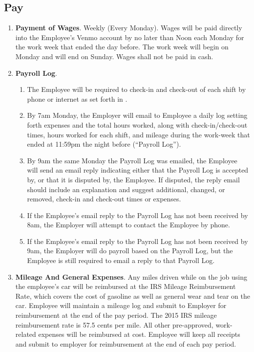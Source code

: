 \documentclass[]{article}
\begin{document}
\subsection*{Pay}
\begin{enumerate}
	\item{\textbf{Payment of Wages}}. Weekly (Every Monday). Wages will be paid directly into the Employee's Venmo account by no later than Noon each Monday for the work week that ended the day before. The work week will begin on Monday and will end on Sunday. Wages shall not be paid in cash.
	\item{\textbf{Payroll Log}}. 
		\begin{enumerate}
			\item The Employee will be required to check-in and check-out of each shift by phone or internet as set forth in . 
			\item By 7am Monday, the Employer will email to Employee a daily log setting forth expenses and the total hours worked, along with check-in/check-out times, hours worked for each shift, and mileage during the work-week that ended at 11:59pm the night before (``Payroll Log'').
			\item By 9am the same Monday the Payroll Log was emailed, the Employee will send an email reply indicating either that the Payroll Log is accepted by, or that it is disputed by, the Employee. If disputed, the reply email should include an explanation and suggest additional, changed, or removed, check-in and check-out times or expenses.
			\item If the Employee's email reply to the Payroll Log has not been received by 8am, the Employer will attempt to contact the Employee by phone.
			\item If the Employee's email reply to the Payroll Log has not been received by 9am, the Employer will do payroll based on the Payroll Log, but the Employee is still required to email a reply to that Payroll Log.
		\end{enumerate}
	\item{\textbf{Mileage And General Expenses}}. Any miles driven while on the job using the employee's car will be reimbursed at the IRS Mileage Reimbursement Rate, which covers the cost of gasoline as well as general wear and tear on the car. Employee will maintain a mileage log and submit to Employer for reimbursement at the end of the pay period. The 2015 IRS mileage reimbursement rate is 57.5 cents per mile.  All other pre-approved, work-related expenses will be reimbursed at cost. Employee will keep all receipts and submit to employer for reimbursement at the end of each pay period.

\end{enumerate}
\end{document}
